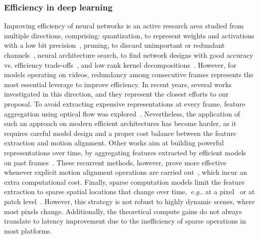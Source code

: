 \documentclass[runningheads]{llncs}
\makeatletter
\DeclareRobustCommand\onedot{\futurelet\@let@token\@onedot}
\def\@onedot{\ifx\@let@token.\else.\null\fi\xspace}
\def\eg{\emph{e.g}\onedot} \def\Eg{\emph{E.g}\onedot}
\makeatother
\begin{document}
\subsubsection{Efficiency in deep learning}
Improving efficiency of neural networks is an active research area studied from multiple directions, comprising: quantization, to represent weights and activations with a low bit precision~\cite{quant2,quant3,krish2018quant,nagel2019dfq}, pruning, to discard unimportant or redundant channels~\cite{denil2013PredictingPI,comp2,li2017PruningFF}, neural architecture search, to find network designs with good accuracy vs. efficiency trade-offs~\cite{fasterseg,donna}, and low rank kernel decompositions~\cite{comp2,zhang2016acceleratingvd}.
However, for models operating on videos, redundancy among consecutive frames represents the most essential leverage to improve efficiency.
In recent years, several works investigated in this direction, and they represent the closest efforts to our proposal.
To avoid extracting expensive representations at every frame, feature aggregation using optical flow was explored~\cite{zhu17dff,accel,flow_guided}. 
Nevertheless, the application of such an approach on modern efficient architectures has become harder, as it requires careful model design and a proper cost balance between the feature extraction and motion alignment. 
Other works aim at building powerful representations over time, by aggregating features extracted by efficient models on past frames~\cite{li2018low,hu2020tdnet,liu2018mobile,memory_guided}.
These recurrent methods, however, prove more effective whenever explicit motion alignment operations are carried out~\cite{hu2020tdnet}, which incur an extra computational cost. 
Finally, sparse computation models limit the feature extraction to sparse spatial locations that change over time,~\eg at a pixel~\cite{skipconv} or at patch level~\cite{patchwork}.
However, this strategy is not robust to highly dynamic scenes, where most pixels change. Additionally, the theoretical compute gains do not always translate to latency improvement due to the inefficiency of sparse operations in most platforms.
\end{document}
